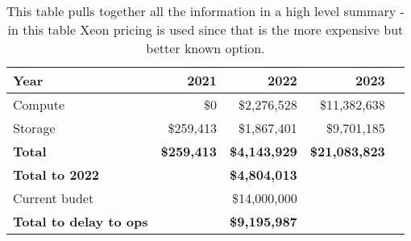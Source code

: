 \tiny \begin{longtable} { |p{}  |r  |r  |r  |r |} 
\caption{This table pulls together all the information in a high level summary - in this table Xeon pricing is used since that is the more expensive but better known option. \label{tab:Summary}}\\ 
\hline 
\textbf{Year}&\textbf{2021}&\textbf{2022}&\textbf{2023} \\ \hline
{Compute}&{\$0}&{\$2,276,528}&{\$11,382,638} \\ \hline
{Storage}&{\$259,413}&{\$1,867,401}&{\$9,701,185} \\ \hline
\textbf{Total}&\textbf{\$259,413}&\textbf{\$4,143,929}&\textbf{\$21,083,823} \\ \hline
\textbf{Total to 2022}&\textbf{}&\textbf{\$4,804,013}& \\ \hline
{Current budet}&{}&{\$14,000,000}& \\ \hline
\textbf{Total to delay to ops }&\textbf{}&\textbf{\$9,195,987}& \\ \hline
\end{longtable} \normalsize
